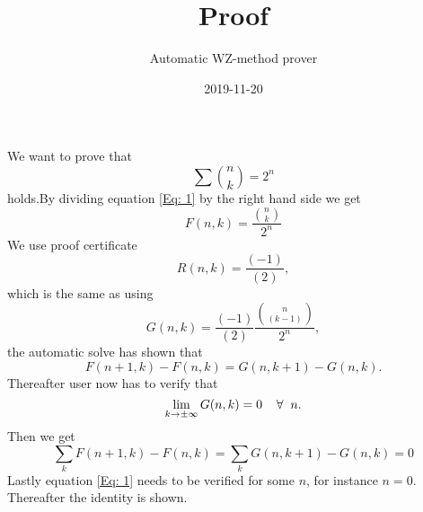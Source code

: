 \documentclass{article}
\title{Proof}
\author{Automatic WZ-method prover}
\date{2019-11-20}
\let\oldforall\forall
\renewcommand{\forall}{\hspace*{2mm}\oldforall\hspace*{1mm}}
\begin{document}
\maketitle
We want to prove that
\begin{equation}\label{Eq: 1}
\sum \binom{n}{k} = 2^n
\end{equation}
holds.By dividing equation \ref{Eq: 1} by the right hand side we get
\begin{equation}
F(n,k)=\frac{\binom{n}{k}}{2^{n}}
\end{equation}
We use proof certificate
\begin{equation}
R(n,k)=\frac{(-1)}{(2)},
\end{equation}
which is the same as using
\begin{equation}
G(n,k)=\frac{(-1)}{(2)}\frac{\binom{n}{(k-1)}}{2^{n}},
\end{equation}
the automatic solve has  shown that
\begin{equation}\label{Eq: WZ1}
F(n+1,k)-F(n,k)=G(n,k+1)-G(n,k).
\end{equation}
Thereafter user now has to verify that
\begin{equation}
\lim_{k\to\pm\infty}G(n,k)=0\forall n.
\end{equation}
Then we get
\begin{equation}
\sum_k F(n+1,k)-F(n,k)=\sum_k G(n,k+1)-G(n,k)=0\end{equation}Lastly equation \ref{Eq: 1} needs to be verified for some $n$, for instance $n=0$. Thereafter the identity is shown.
\end{document}
